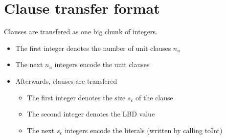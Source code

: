 \documentclass[a4paper,10pt]{article}
\begin{document}
\section{Clause transfer format}
Clauses are transfered as one big chunk of integers. 
\begin{itemize}
 \item The first integer denotes the number of unit clauses $n_u$
 \item The next $n_u$ integers encode the unit clauses 
 \item Afterwards, clauses are transfered 
    \begin{itemize}
     \item The first integer denotes the size $s_c$ of the clause
     \item The second integer denotes the LBD value
     \item The next $s_c$ integers encode the literals (written by calling toInt)
    \end{itemize}

\end{itemize}
\end{document}
